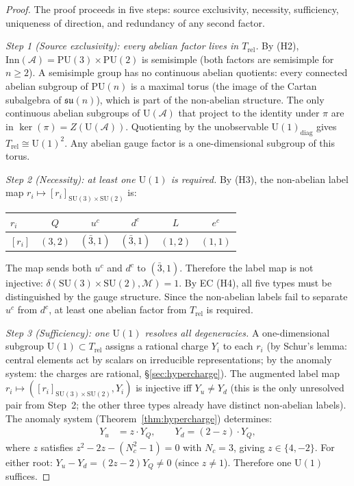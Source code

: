 \documentclass[11pt]{article}
\theoremstyle{definition}
\newcommand{\SU}{\mathrm{SU}}
\newcommand{\U}{\mathrm{U}}
\begin{document}
\begin{proof}
The proof proceeds in five steps: source exclusivity, necessity,
sufficiency, uniqueness of direction, and redundancy of any second
factor.

\textit{Step 1 (Source exclusivity): every abelian factor lives in
$T_{\mathrm{rel}}$.}\quad
By (H2), $\mathrm{Inn}(\mathcal{A}) = \mathrm{PU}(3) \times
\mathrm{PU}(2)$ is semisimple (both factors are semisimple for
$n \ge 2$).  A semisimple group has no continuous abelian
quotients: every connected abelian subgroup of $\mathrm{PU}(n)$ is
a maximal torus (the image of the Cartan subalgebra of
$\mathfrak{su}(n)$), which is part of the non-abelian structure.
The only continuous abelian subgroups of $\mathrm{U}(\mathcal{A})$
that project to the identity under $\pi$ are in $\ker(\pi) =
Z(\mathrm{U}(\mathcal{A}))$.  Quotienting by the unobservable
$\mathrm{U}(1)_{\mathrm{diag}}$ gives $T_{\mathrm{rel}} \cong
\mathrm{U}(1)^2$.  Any abelian gauge factor is a one-dimensional
subgroup of this torus.

\textit{Step 2 (Necessity): at least one $\U(1)$ is required.}\quad
By (H3), the non-abelian label map
$r_i \mapsto [r_i]_{\SU(3) \times \SU(2)}$ is:
\begin{center}\small
\begin{tabular}{@{}lccccc@{}}
\toprule
$r_i$ & $Q$ & $u^c$ & $d^c$ & $L$ & $e^c$ \\
\midrule
$[r_i]$ & $(3,2)$ & $(\bar{3},1)$ & $(\bar{3},1)$ & $(1,2)$ & $(1,1)$ \\
\bottomrule
\end{tabular}
\end{center}
The map sends both $u^c$ and $d^c$ to $(\bar{3}, 1)$.  Therefore
the label map is not injective: $\delta(\SU(3) \times \SU(2),
\mathcal{M}) = 1$.  By EC (H4), all five types must be
distinguished by the gauge structure.  Since the non-abelian
labels fail to separate $u^c$ from $d^c$, at least one abelian
factor from $T_{\mathrm{rel}}$ is required.

\textit{Step 3 (Sufficiency): one $\U(1)$ resolves all
degeneracies.}\quad
A one-dimensional subgroup $\U(1) \subset T_{\mathrm{rel}}$ assigns a
rational charge $Y_i$ to each $r_i$ (by Schur's lemma: central
elements act by scalars on irreducible representations; by the anomaly
system: the charges are rational, \S\ref{sec:hypercharge}).  The
augmented label map $r_i \mapsto ([r_i]_{\SU(3) \times \SU(2)},
Y_i)$ is injective iff $Y_u \ne Y_d$ (this is the only
unresolved pair from Step~2; the other three types already have
distinct non-abelian labels).  The anomaly system
(Theorem~\ref{thm:hypercharge}) determines:
\begin{align*}
  Y_u &= z \cdot Y_Q, \qquad Y_d = (2 - z) \cdot Y_Q,
\end{align*}
where $z$ satisfies $z^2 - 2z - (N_c^2 - 1) = 0$ with $N_c = 3$,
giving $z \in \{4, -2\}$.  For either root:
$Y_u - Y_d = (2z - 2) Y_Q \ne 0$ (since $z \ne 1$).
Therefore one $\U(1)$ suffices.


\end{proof}
\end{document}
